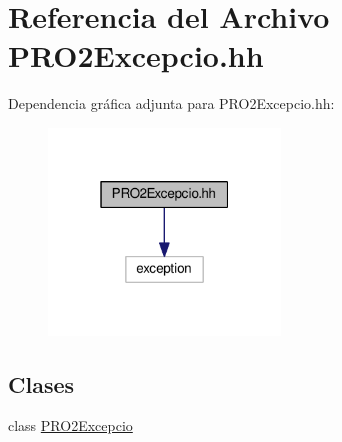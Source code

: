 \hypertarget{_p_r_o2_excepcio_8hh}{}\section{Referencia del Archivo P\+R\+O2\+Excepcio.\+hh}
\label{_p_r_o2_excepcio_8hh}
Dependencia gráfica adjunta para P\+R\+O2\+Excepcio.\+hh\+:
\nopagebreak
\begin{figure}[H]
\begin{center}
\leavevmode
\includegraphics[width=175pt]{_p_r_o2_excepcio_8hh__incl}
\end{center}
\end{figure}
\subsection*{Clases}
\begin{DoxyCompactItemize}
\item 
class \hyperlink{class_p_r_o2_excepcio}{P\+R\+O2\+Excepcio}
\end{DoxyCompactItemize}
